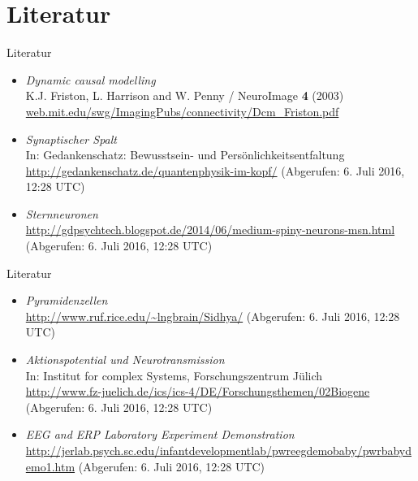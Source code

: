 \documentclass{beamer}
\begin{document}
\section{Literatur}
	\begin{frame}{Literatur}
		\begin{itemize}
			\item \textit{Dynamic causal modelling} \\ {\small K.J. Friston, L. Harrison and W. Penny / NeuroImage \textbf{4} (2003)} \\ {\footnotesize \url{web.mit.edu/swg/ImagingPubs/connectivity/Dcm_Friston.pdf}}
			\item \textit{Synaptischer Spalt}\\  {\small In: Gedankenschatz: Bewusstsein- und Persönlichkeitsentfaltung}\\{\footnotesize \url{http://gedankenschatz.de/quantenphysik-im-kopf/}}  {\tiny(Abgerufen: 6. Juli 2016, 12:28 UTC)}
			\item \textit{Sternneuronen}\\{\footnotesize \url{http://gdpsychtech.blogspot.de/2014/06/medium-spiny-neurons-msn.html}}  {\tiny(Abgerufen: 6. Juli 2016, 12:28 UTC)}	
						
		\end{itemize}
	\end{frame}
	
	\begin{frame}{Literatur}
		\begin{itemize}
			\item \textit{Pyramidenzellen}\\{\footnotesize \url{http://www.ruf.rice.edu/~lngbrain/Sidhya/}}  {\tiny(Abgerufen: 6. Juli 2016, 12:28 UTC)}	
			\item \textit{Aktionspotential und Neurotransmission}\\{\small In: Institut for complex Systems, Forschungszentrum Jülich}\\{\footnotesize \url{http://www.fz-juelich.de/ics/ics-4/DE/Forschungsthemen/02Biogene}}  {\tiny(Abgerufen: 6. Juli 2016, 12:28 UTC)}
			\item \textit{EEG and ERP Laboratory Experiment Demonstration}\\{\footnotesize \url{http://jerlab.psych.sc.edu/infantdevelopmentlab/pwreegdemobaby/pwrbabydemo1.htm}}  {\tiny(Abgerufen: 6. Juli 2016, 12:28 UTC)}
		\end{itemize}
	\end{frame}
\end{document}
